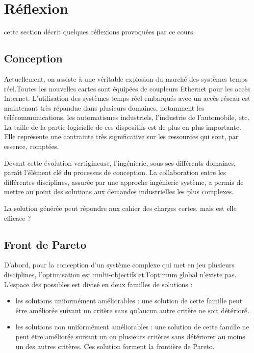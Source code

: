 \documentclass[11pt]{article}
\begin{document}
\section{Réflexion}

cette section décrit quelques réflexions provoquées par ce cours.

\subsection{Conception}

Actuellement, on assiste à une véritable explosion du marché des systèmes temps
réel.Toutes les nouvelles cartes sont équipées de coupleurs Ethernet pour les
accès Internet. L'utilisation des systèmes temps réel embarqués avec un accès
réseau est maintenant très répandue dans plusieurs domaines, notamment les 
télécommunications, les automatismes industriels, l'industrie de l’automobile,
etc. La taille de la partie logicielle de ces dispositifs est de plus en plus
importante. Elle représente une contrainte très significative sur les ressources
qui sont, par essence, comptées.

Devant cette évolution vertigineuse, l'ingénierie, sous ses différents domaines,
paraît l'élément clé du processus de conception. La collaboration entre les
différentes disciplines, assurée par une approche ingénierie système, a permis
de mettre au point des solutions aux demandes industrielles les plus complexes.

La solution générée peut répondre aux cahier des charges certes, mais est elle
efficace ?

\subsection{Front de Pareto}

D'abord, pour la conception d'un système complexe qui met en jeu plusieurs
disciplines, l'optimisation est multi-objectifs et l'optimum global n'existe
pas. L'espace des possibles est divisé en deux familles de solutions :
\begin{itemize}
\item les solutions uniformément améliorables : une solution de cette famille
peut être améliorée suivant un critère sans qu'aucun autre critère ne soit
détérioré.
\item les solutions non uniformément améliorables : une solution de cette
famille ne peut être améliorée suivant un ou plusieurs critères sans détériorer
au moins un des autres critères. Ces solution forment la frontière de Pareto.
\end{itemize}
\end{document}
